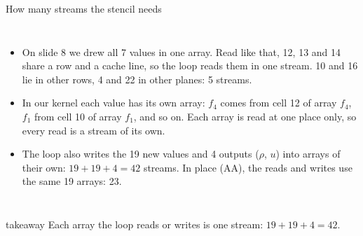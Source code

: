 \documentclass[aspectratio=169,10pt,t]{beamer}
\newcommand{\takeaway}[1]{\par\vfill
  \begin{beamercolorbox}[wd=\textwidth,sep=4pt,rounded=true]{takeaway}
    \small #1
  \end{beamercolorbox}}
\begin{document}
\begin{frame}{How many streams the stencil needs}
  \begin{columns}[T,onlytextwidth]
    \vspace{1mm}
    
    \vspace{1mm}
    \begin{itemize}\footnotesize
      \item On slide 8 we drew all 7 values in one array. Read like that, 12, 13 and 14 share a row and a cache
            line, so the loop reads them in one stream. 10 and 16 lie in other rows, 4 and 22 in other
            planes: 5 streams.
      \item<2-> In our kernel each value has its own array: $f_4$ comes from cell 12 of array $f_4$, $f_1$ from
            cell 10 of array $f_1$, and so on. Each array is read at one place only, so every read is a stream
            of its own.
      \item<3-> The loop also writes the 19 new values and 4 outputs ($\rho$, $u$) into arrays of their own:
            $19 + 19 + 4 = 42$ streams. In place (AA), the reads and writes use the same 19 arrays: 23.
    \end{itemize}
  \end{columns}
  \vfill
  \takeaway{Each array the loop reads or writes is one stream: $19 + 19 + 4 = 42$.}
\end{frame}
\end{document}

